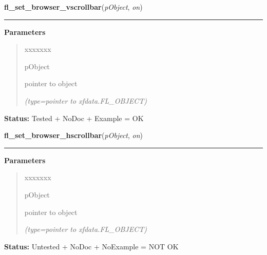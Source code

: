 \hspace{.8\funcindent}\begin{boxedminipage}{\funcwidth}

    \raggedright \textbf{fl\_set\_browser\_vscrollbar}(\textit{pObject}, \textit{on})

    \vspace{-1.5ex}

    \rule{\textwidth}{0.5\fboxrule}
\setlength{\parskip}{2ex}
\setlength{\parskip}{1ex}
      \textbf{Parameters}
      \vspace{-1ex}

      \begin{quote}
        \begin{Ventry}{xxxxxxx}

          \item[pObject]

          pointer to object

            {\it (type=pointer to xfdata.FL\_OBJECT)}

        \end{Ventry}

      \end{quote}

\textbf{Status:} Tested + NoDoc + Example = OK



    \end{boxedminipage}

    \label{xformslib:library:fl_set_browser_hscrollbar}

    \vspace{0.5ex}

\hspace{.8\funcindent}\begin{boxedminipage}{\funcwidth}

    \raggedright \textbf{fl\_set\_browser\_hscrollbar}(\textit{pObject}, \textit{on})

    \vspace{-1.5ex}

    \rule{\textwidth}{0.5\fboxrule}
\setlength{\parskip}{2ex}
\setlength{\parskip}{1ex}
      \textbf{Parameters}
      \vspace{-1ex}

      \begin{quote}
        \begin{Ventry}{xxxxxxx}

          \item[pObject]

          pointer to object

            {\it (type=pointer to xfdata.FL\_OBJECT)}

        \end{Ventry}

      \end{quote}

\textbf{Status:} Untested + NoDoc + NoExample = NOT OK



    \end{boxedminipage}

